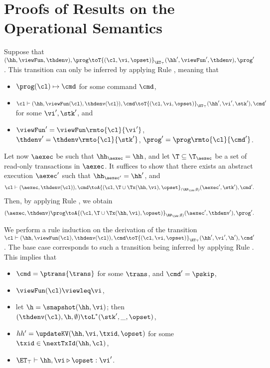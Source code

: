 \section{Proofs of Results on the Operational Semantics}


Suppose that $(\hh, \viewFun, \thdenv), \prog \toT{(\cl, \vi, \opset)}_{\ET_{\top}} (\hh', \viewFun', \thdenv), \prog'$. 
This transition can only be inferred by applying Rule , meaning that 
\begin{itemize}
\item $\prog(\cl) \mapsto \cmd$ for some command $\cmd$, 
\item $\cl \vdash (\hh, \viewFun(\cl), \thdenv(\cl)), \cmd \toT{(\cl, \vi, \opset)}_{\ET_{\top}} (\hh', \vi', \stk'), \cmd'$ 
for some $\vi', \stk'$, and 
\item $\viewFun' = \viewFun\rmto{\cl}{\vi'}$, $\thdenv' = \thdenv\rmto{\cl}{\stk'}$, $\prog' = \prog\rmto{\cl}{\cmd'}$. 
\end{itemize}
Let now $\aexec$ be such that $\hh_{\aexec} = \hh$, and let $\T \subseteq \T_{\aexec}$ be a set of read-only 
transactions in $\aexec$. It suffices to show that there exists an abstract execution $\aexec'$ such that 
$\hh_{\aexec'} = \hh'$, and 
\[
\cl \vdash (\aexec, \thdenv(\cl)), \cmd \toA{(\cl, \T \cup \Tx(\hh, \vi), \opset}_{(\RP_{\LWW}, \emptyset)} (\aexec', \stk'), \cmd'.
\]
Then, by applying Rule , we obtain 
\[ 
(\aexec, \thdenv) \prog \toA{(\cl, \T \cup \Tx(\hh,\vi), \opset)}_{\RP_{\LWW}, \emptyset)} (\aexec' ,\thdenv'), \prog'.
\]

We perform a rule induction on the derivation of the transition $\cl \vdash (\hh, \viewFun(\cl), \thdenv(\cl)), \cmd \toT{(\cl, \vi, \opset)}_{\ET_{\top}} (\hh', \vi', \h'), \cmd'$. 
The base case corresponds to such a transition being inferred by applying Rule . 
This implies that 
\begin{itemize}
\item $\cmd = \ptrans{\trans}$ for some $\trans$, and $\cmd' = \pskip$,
\item $\viewFun(\cl) \viewleq \vi$, 
\item let $\h = \snapshot(\hh, \vi)$; then $(\thdenv(\cl), \h, \emptyset) \toL^{\ast} (\stk', \_, \opset)$, 
\item $hh' = \updateKV(\hh, \vi, \txid, \opset)$ for some $\txid \in \nextTxId(\hh, \cl)$, 
\item $\ET_{\top} \vdash \hh, \vi \triangleright \opset: \vi'$.
\end{itemize}

